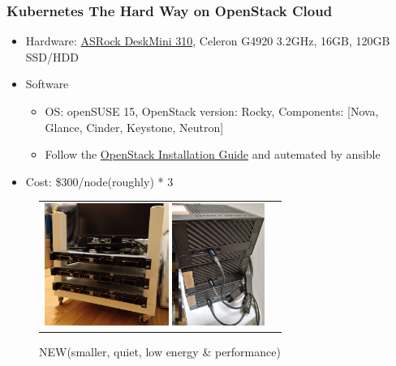 \documentclass[aspectratio=169,11pt,hyperref={colorlinks=true}]{beamer}
\begin{document}
\begin{frame}
  \frametitle{Kubernetes The Hard Way on OpenStack Cloud}
  \begin{itemize}
    \item Hardware: \href{https://www.asrock.com/nettop/Intel/DeskMini 310 Series}{ASRock DeskMini 310}, Celeron G4920 3.2GHz, 16GB, 120GB SSD/HDD
    \item Software
      \begin{itemize}
        \item {OS: openSUSE 15, OpenStack version: Rocky, Components: [Nova, Glance, Cinder, Keystone, Neutron]}
        \item Follow the \href{https://docs.openstack.org/install-guide/}{OpenStack Installation Guide} and autemated by ansible
      \end{itemize}
    \item Cost: \$300/node(roughly) * 3
  \end{itemize}
  \begin{figure}
    \begin{tabular}{cc}
      \begin{minipage}[t]{0.45\hsize}
        \centering
        \includegraphics[height=40mm]{images/server_front.jpg}
        \caption{OLD}
      \end{minipage}
      \begin{minipage}[t]{0.45\hsize}
        \centering
        \includegraphics[height=40mm]{images/my-new-cloud.jpg}
        \caption{NEW(smaller, quiet, low energy \& performance)}
      \end{minipage}
    \end{tabular}
  \end{figure}
\end{frame}
\end{document}
